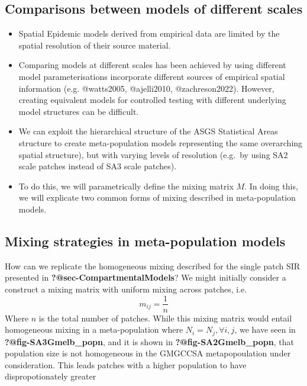 \documentclass[
  letterpaper,
  DIV=11,
  numbers=noendperiod]{scrartcl}
\begin{document}
\hypertarget{comparisons-between-models-of-different-scales}{%
\subsection{Comparisons between models of different
scales}\label{comparisons-between-models-of-different-scales}}

\begin{itemize}
\item
  Spatial Epidemic models derived from empirical data are limited by the
  spatial resolution of their source material.
\item
  Comparing models at different scales has been achieved by using
  different model parameterisations incorporate different sources of
  empirical spatial information (e.g. @watts2005, @ajelli2010,
  @zachreson2022). However, creating equivalent models for controlled
  testing with different underlying model structures can be difficult.
\item
  We can exploit the hierarchical structure of the ASGS Statistical
  Areas structure to create meta-population models representing the same
  overarching spatial structure), but with varying levels of resolution
  (e.g.~by using SA2 scale patches instead of SA3 scale patches).
\item
  To do this, we will parametrically define the mixing matrix \(M\). In
  doing this, we will explicate two common forms of mixing described in
  meta-population models.
\end{itemize}

\hypertarget{mixing-strategies-in-meta-population-models}{%
\subsection{Mixing strategies in meta-population
models}\label{mixing-strategies-in-meta-population-models}}

How can we replicate the homogeneous mixing described for the single
patch SIR presented in \textbf{?@sec-CompartmentalModels}? We might
initially consider a construct a mixing matrix with uniform mixing
across patches, i.e.~\[
m_{ij} = \frac{1}{n}
\]Where \(n\) is the total number of patches. While this mixing matrix
would entail homogeneous mixing in a meta-population where
\(N_i = N_j, \forall i,j\), we have seen in
\textbf{?@fig-SA3Gmelb\_popn}, and it is shown in
\textbf{?@fig-SA2Gmelb\_popn}, that population size is not homogeneous
in the GMGCCSA metapopoulation under consideration. This leads patches
with a higher population to have dispropotionately greater
\end{document}
